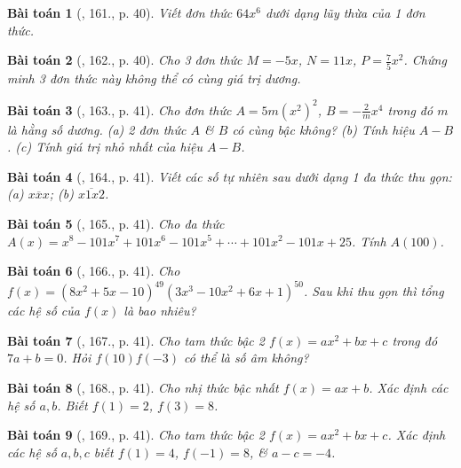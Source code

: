 \documentclass{article}
\newtheorem{baitoan}{Bài toán}
\begin{document}
\begin{baitoan}[\cite{Tuyen_Toan_7}, 161., p. 40]
	Viết đơn thức $64x^6$ dưới dạng lũy thừa của 1 đơn thức.
\end{baitoan}

\begin{baitoan}[\cite{Tuyen_Toan_7}, 162., p. 40]
	Cho 3 đơn thức $M = -5x$, $N = 11x$, $P = \frac{7}{5}x^2$. Chứng minh 3 đơn thức này không thể có cùng giá trị dương.
\end{baitoan}

\begin{baitoan}[\cite{Tuyen_Toan_7}, 163., p. 41]
	Cho đơn thức $A = 5m(x^2)^2$, $B = -\frac{2}{m}x^4$ trong đó $m$ là hằng số dương. (a) 2 đơn thức $A$ \& $B$ có cùng bậc không? (b) Tính hiệu $A - B$. (c) Tính giá trị nhỏ nhất của hiệu $A - B$.
\end{baitoan}

\begin{baitoan}[\cite{Tuyen_Toan_7}, 164., p. 41]
	Viết các số tự nhiên sau dưới dạng 1 đa thức thu gọn: (a) $\overline{xxx}$; (b) $\overline{x1x2}$.
\end{baitoan}

\begin{baitoan}[\cite{Tuyen_Toan_7}, 165., p. 41]
	Cho đa thức $A(x) = x^8 - 101x^7 + 101x^6 - 101x^5 + \cdots + 101x^2 - 101x + 25$. Tính $A(100)$.
\end{baitoan}

\begin{baitoan}[\cite{Tuyen_Toan_7}, 166., p. 41]
	Cho $f(x) = (8x^2 + 5x - 10)^{49}(3x^3 - 10x^2 + 6x + 1)^{50}$. Sau khi thu gọn thì tổng các hệ số của $f(x)$ là bao nhiêu?
\end{baitoan}

\begin{baitoan}[\cite{Tuyen_Toan_7}, 167., p. 41]
	Cho tam thức bậc 2 $f(x) = ax^2 + bx + c$ trong đó $7a + b = 0$. Hỏi $f(10)f(-3)$ có thể là số âm không?
\end{baitoan}

\begin{baitoan}[\cite{Tuyen_Toan_7}, 168., p. 41]
	Cho nhị thức bậc nhất $f(x) = ax + b$. Xác định các hệ số $a,b$. Biết $f(1) = 2$, $f(3) = 8$.
\end{baitoan}

\begin{baitoan}[\cite{Tuyen_Toan_7}, 169., p. 41]
	Cho tam thức bậc 2 $f(x) = ax^2 + bx + c$. Xác định các hệ số $a,b,c$ biết $f(1) = 4$, $f(-1) = 8$, \& $a - c = -4$.
\end{baitoan}
\end{document}
